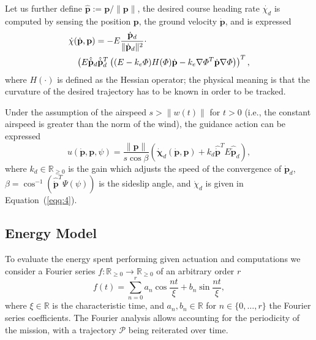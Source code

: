 \documentclass[letterpaper,10pt,conference]{ieeeconf}
\begin{document}
Let us further define $\hat{\mathbf{p}}:=\mathbf{p}/\|\mathbf{p}\|$, the desired course heading rate $\dot{\chi_d}$ is computed by sensing the position $\mathbf{p}$, the ground velocity $\dot{\mathbf{p}}$, and is expressed
\begin{equation}\label{eqq:4}\begin{split}
  &\dot{\chi}(\dot{\mathbf{p}},\mathbf{p})=-E\frac{\dot{\mathbf{p}}_d}{\|\dot{\mathbf{p}}_d\|^2}\cdot\\
  &\hspace{2ex}\left( E\hat{\dot{\mathbf{p}}}_d\hat{\dot{\mathbf{p}}}_d^T\left( (E-k_e\varPhi)H(\varPhi)\dot{\mathbf{p}}-k_e\nabla\varPhi^T\dot{\mathbf{p}}\nabla\varPhi \right) \right)^T,
\end{split}
\end{equation} 
where $H(\cdot)$ is defined as the Hessian operator; the physical meaning is that the curvature of the desired trajectory has to be known in order to be tracked.

Under the assumption of the airspeed $s>\|w(t)\|$ for $t>0$ (i.e., the constant airspeed is greater than the norm of the wind), the guidance action can be expressed
\begin{equation}\label{eqq:5}
  u(\dot{\mathbf{p}},\mathbf{p},\psi)=\frac{\|\mathbf{p}\|}{s\cos{\beta}}\left( \dot{\mathbf{\chi}}_d(\dot{\mathbf{p}},\mathbf{p})+k_d\hat{\dot{\mathbf{p}}}^TE\hat{\dot{\mathbf{p}}}_d \right),
\end{equation} 
where $k_d\in\mathbb{R}_{\geq 0}$ is the gain which adjusts the speed of the convergence of $\dot{\mathbf{p}}_d$, $\beta=\cos^{-1}{\left( \hat{\dot{\mathbf{p}}}^T\Psi(\psi) \right)}$ is the sideslip angle, and $\dot{\chi}_d$ is given in Equation~(\ref{eqq:4}).

\subsection{Energy Model}

To evaluate the energy spent performing given actuation and computations we consider a Fourier series $f:\mathbb{R}_{\geq 0}\rightarrow\mathbb{R}_{\geq 0}$ of an arbitrary order $r$
\begin{equation}\label{eqq:6}
  f(t)=\sum_{n=0}^{r}{a_n\cos{\frac{nt}{\xi}}+b_n\sin{\frac{nt}{\xi}}},
\end{equation}
where $\xi\in\mathbb{R}$ is the characteristic time, and $a_n, b_n\in\mathbb{R}$ for $n\in\{0,\dotsc,r\}$ the Fourier series coefficients. The Fourier analysis allows accounting for the periodicity of the mission, with a trajectory $\mathcal{P}$ being reiterated over time. 
\end{document}
